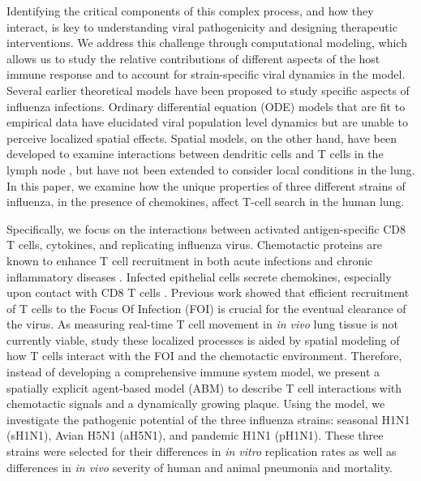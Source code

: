 \documentclass[preprint,10pt,numbers]{elsarticle}
\begin{document}
Identifying the critical components of this complex process, and how they interact, is key to understanding viral pathogenicity and designing therapeutic interventions.  We address this challenge through computational modeling, which allows us to study the relative contributions of different aspects of the host immune response and to account for strain-specific viral dynamics in the model.  Several earlier theoretical models have been proposed to study specific aspects of influenza infections. Ordinary differential equation (ODE) models that are fit to empirical data \citep{Handel2008, Lee2009, Miao2010a, Saenz2010, Murillo2013, Crauste2015, Price2015} have elucidated viral population level dynamics but are unable to perceive localized spatial effects.  Spatial models, on the other hand, have been developed to examine interactions between dendritic cells and T cells in the lymph node \citep{Beauchemin2005, Beltman2007, Zheng2008, Mirsky2011, Celli2012, Vroomans2012, Textor2014}, but have not been extended to consider local conditions in the lung.   In this paper, we examine how the unique properties of three different strains of influenza, in the presence of chemokines, affect T-cell search in the human lung.

Specifically, we focus on the interactions between activated antigen-specific CD8 T cells, cytokines, and replicating influenza virus.  Chemotactic proteins are known to enhance T cell recruitment in both acute infections and chronic inflammatory diseases \citep{Gunn1998, Medoff2005, Okada2005, Castellino2006, Bromley2008}. Infected epithelial cells secrete chemokines, especially upon contact with CD8 T cells  \citep{Zhao2000, Chan2005}. Previous work showed that efficient recruitment of T cells to the Focus Of Infection (FOI) is crucial for the eventual clearance of the virus\citep{Cerwenka1999, Kim2011}.   As measuring real-time T cell movement in \textit{in vivo} lung tissue is not currently viable, study these localized processes is aided by spatial modeling of how T cells interact with the FOI and the chemotactic environment.  Therefore, instead of developing a comprehensive immune system model, we present a spatially explicit agent-based model (ABM) to describe T cell interactions with chemotactic signals and a dynamically growing plaque.  Using the model, we investigate the pathogenic potential of the three  influenza strains: seasonal H1N1 (sH1N1), Avian H5N1 (aH5N1), and pandemic H1N1 (pH1N1). These three strains were selected for their differences in \textit{in vitro} replication rates \citep{Mitchell2011} as well as differences in \textit{in vivo} severity of human and animal pneumonia and mortality.
\end{document}
